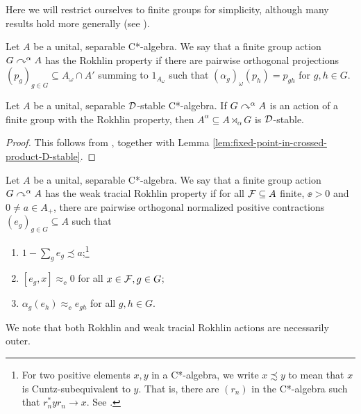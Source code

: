 \documentclass[12pt]{amsart}
\begin{document}
  Here we will restrict ourselves to finite groups for simplicity, although many results hold more generally (see \cite{HirshbergWinter07,HirshbergOrovitz13,GardellaHirshberg18}). 

  \begin{defn}
      Let $A$ be a unital, separable C*-algebra. We say that a finite group action $G \curvearrowright^\alpha A$ has the Rokhlin property if there are pairwise orthogonal projections $(p_g)_{g \in G} \subseteq A_\omega \cap A'$ summing to $1_{A_\omega}$ such that $(\alpha_g)_\omega(p_h) = p_{gh}$ for $g,h \in G$.
    \end{defn}

    \begin{prop}
      Let $A$ be a unital, separable $\mathcal{D}$-stable C*-algebra. If $G \curvearrowright^\alpha A$ is an action of a finite group with the Rokhlin property, then $A^\alpha \subseteq A \rtimes_\alpha G$ is $\mathcal{D}$-stable.
          \begin{proof}
            This follows from \cite[Theorem 3.3]{HirshbergWinter07}, together with Lemma \ref{lem:fixed-point-in-crossed-product-D-stable}.
          \end{proof}
    \end{prop}


    \begin{defn}
        Let $A$ be a unital, separable C*-algebra. We say that a finite group action $G \curvearrowright^\alpha A$ has the weak tracial Rokhlin property if for all  $\mathcal{F} \subseteq A$ finite, $\ee > 0$ and $0 \neq a \in A_+$, there are pairwise orthogonal normalized positive contractions $(e_g)_{g \in G} \subseteq A$ such that
              \begin{enumerate}
                \item $1 - \sum_g e_g \precsim a$;\footnote{For two positive elements $x,y$ in a C*-algebra, we write $x \precsim y$ to mean that $x$ is Cuntz-subequivalent to $y$. That is, there are $(r_n)$ in the C*-algebra such that $r_n^*yr_n \to x$. See \cite[Section 2]{HirshbergOrovitz13}.}
                \item $[e_g,x] \approx_\ee 0$ for all $x \in \mathcal{F}, g \in G$;
                \item $\alpha_g(e_h) \approx_\ee e_{gh}$ for all $g,h \in G$.
              \end{enumerate}
      \end{defn}

      We note that both Rokhlin and weak tracial Rokhlin actions are necessarily outer. 
\end{document}
